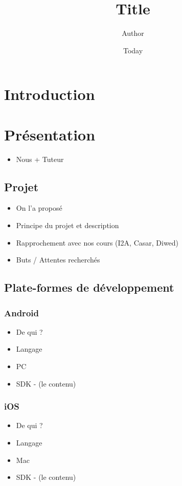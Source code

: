 \documentclass[]{report}
\begin{document}
\title{Title}
\author{Author}
\date{Today}
\maketitle

\tableofcontents

\chapter{Introduction}

\chapter{Présentation}
	\begin{itemize}
		\item{Nous + Tuteur}
	\end{itemize}
	
	\section{Projet}
		\begin{itemize}
			\item{On l'a proposé}
			\item{Principe du projet et description}
			\item{Rapprochement avec nos cours (I2A, Casar, Diwed)}
			\item{Buts / Attentes recherchés}
		\end{itemize}
		
	\section{Plate-formes de développement}
		\subsection{Android}
			\begin{itemize}
				\item{De qui ?}
				\item{Langage}
				\item{PC}
				\item{SDK - (le contenu)}
			\end{itemize}
		\subsection{iOS}
			\begin{itemize}
				\item{De qui ?}
				\item{Langage}
				\item{Mac}
				\item{SDK - (le contenu)}
			\end{itemize}
			
\end{document}
